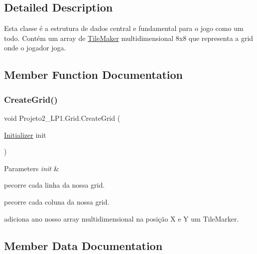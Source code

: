 \subsection{Detailed Description}
Esta classe é a estrutura de dados central e fundamental para o jogo como um todo. Contém um array de \mbox{\hyperlink{class_projeto2___l_p1_1_1_tile_maker}{Tile\+Maker}} multidimensional 8x8 que representa a grid onde o jogador joga. 



\subsection{Member Function Documentation}
\mbox{\label{class_projeto2___l_p1_1_1_grid_a7f3a7e9c295766d38a08117449cf8d3c}} 
\subsubsection{\texorpdfstring{Create\+Grid()}{CreateGrid()}}
{\footnotesize\ttfamily void Projeto2\+\_\+\+L\+P1.\+Grid.\+Create\+Grid (\begin{DoxyParamCaption}\item[{\mbox{\hyperlink{class_projeto2___l_p1_1_1_initializer}{Initializer}}}]{init }\end{DoxyParamCaption})\hspace{0.3cm}{\ttfamily [inline]}}






\begin{DoxyParams}{Parameters}
{\em init} & \\
\hline
\end{DoxyParams}
pecorre cada linha da nossa grid.

pecorre cada coluna da nossa grid.

adiciona ano nosso array multidimensional na posição X e Y um Tile\+Marker. 

\subsection{Member Data Documentation}
\mbox{\label{class_projeto2___l_p1_1_1_grid_a517769f1ab5634bb5cb20a3afde72083}} 
